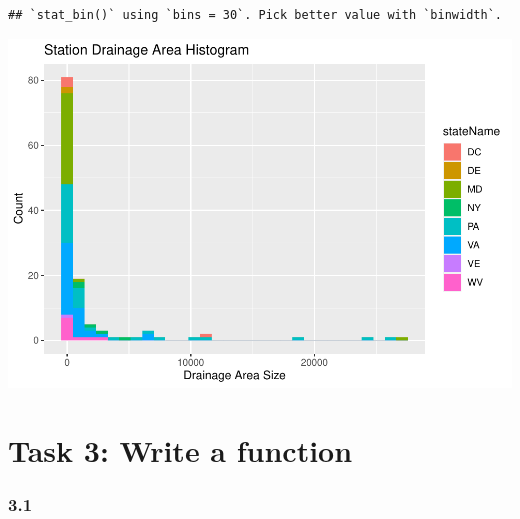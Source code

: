 \documentclass[
]{article}
\begin{document}
\begin{verbatim}
## `stat_bin()` using `bins = 30`. Pick better value with `binwidth`.
\end{verbatim}

\includegraphics{Lab1_files/figure-latex/2.3-1.pdf}

\hypertarget{task-3-write-a-function}{%
\section{Task 3: Write a function}\label{task-3-write-a-function}}

\hypertarget{section-7}{%
\subsubsection{3.1}\label{section-7}}
\end{document}
